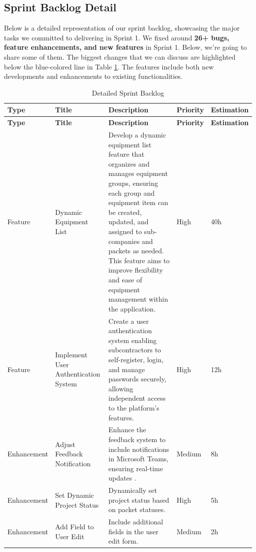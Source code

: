 \subsection{Sprint Backlog Detail}
Below is a detailed representation of our sprint backlog, showcasing the major tasks we committed to delivering in Sprint 1. We fixed around \textbf{26+ bugs, feature enhancements, and new features} in Sprint 1. Below, we're going to share some of them. The biggest changes that we can discuss are highlighted below the blue-colored line in Table \ref{tab:sprint-backlog}. The features include both new developments and enhancements to existing functionalities.
\begin{longtable}{ | m{} | m{} | m{} | m{} | m{} | }
    \caption{Detailed Sprint Backlog}
    \label{tab:sprint-backlog} \\
    \hline
    \textbf{Type} & \textbf{Title} & \textbf{Description} & \textbf{Priority} & \textbf{Estimation} \\
    \hline
    \endfirsthead
    \hline
    \textbf{Type} & \textbf{Title} & \textbf{Description} & \textbf{Priority} & \textbf{Estimation} \\
    \hline
    \endhead
    \hline
    \endfoot
    \endlastfoot
    \rowcolor{blue!20} 
    Feature & Dynamic Equipment List & Develop a dynamic equipment list feature that organizes and manages equipment groups, ensuring each group and equipment item can be created, updated, and assigned to sub-companies and packets as needed. This feature aims to improve flexibility and ease of equipment management within the application. & High & 40h \\
    \hline
    \rowcolor{blue!20} Feature & Implement User Authentication System & Create a user authentication system enabling subcontractors to self-register, login, and manage passwords securely, allowing independent access to the platform's features. & High & 12h \\
    \hline
    \rowcolor{blue!20} 
    Enhancement & Adjust Feedback Notification & Enhance the feedback system to include notifications in Microsoft Teams, ensuring real-time updates . & Medium & 8h \\
    \hline
    Enhancement & Set Dynamic Project Status & Dynamically set project status based on packet statuses. & High & 5h \\
    \hline
    Enhancement & Add Field to User Edit & Include additional fields in the user edit form. & Medium & 2h \\

\end{longtable}
